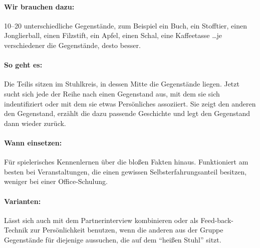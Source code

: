 \paragraph{Wir brauchen dazu:} 10--20 unterschiedliche Gegenstände, zum Beispiel ein Buch, ein Stofftier, einen Jonglierball, einen Filzstift, ein Apfel, einen Schal, eine Kaffeetasse \ldots je verschiedener die Gegenstände, desto besser.
\paragraph{So geht es:} Die Teilis sitzen im Stuhlkreis, in dessen Mitte die Gegenstände liegen. Jetzt sucht sich jede der Reihe nach einen Gegenstand aus, mit dem sie sich indentifiziert oder mit dem sie etwas Persönliches assoziiert. Sie zeigt den anderen den Gegenstand, erzählt die dazu passende Geschichte und legt den Gegenstand dann wieder zurück.
\paragraph{Wann einsetzen:} Für spielerisches Kennenlernen über die bloßen Fakten hinaus. Funktioniert am besten bei Veranstaltungen, die einen gewissen Selbsterfahrungsanteil besitzen, weniger bei einer Office-Schulung.
\paragraph{Varianten:} Lässt sich auch mit dem Partnerinterview kombinieren oder als Feed-back-Technik zur Persönlichkeit benutzen, wenn die anderen aus der Gruppe Gegenstände für diejenige aussuchen, die auf dem "`heißen Stuhl"' sitzt.

